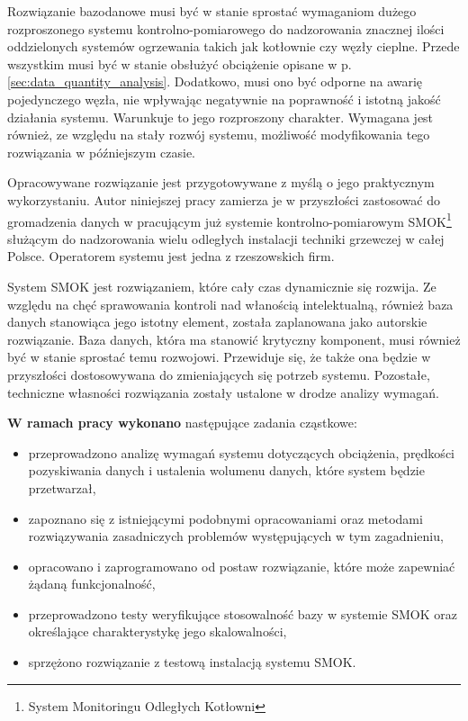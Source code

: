 \documentclass[a4paper,polish,12pt,twoside]{article}
\begin{document}
Rozwiązanie bazodanowe musi być w stanie sprostać wymaganiom dużego rozproszonego systemu kontrolno-pomiarowego do nadzorowania znacznej ilości oddzielonych systemów ogrzewania takich jak kotłownie czy węzły cieplne. Przede wszystkim musi  być w stanie obsłużyć obciążenie opisane w p. \ref{sec:data_quantity_analysis}. Dodatkowo, musi ono być odporne na awarię pojedynczego węzła, nie wpływając negatywnie na poprawność i istotną jakość działania systemu. Warunkuje to jego rozproszony charakter. Wymagana jest również, ze względu na stały rozwój systemu, możliwość modyfikowania tego rozwiązania w późniejszym czasie.

Opracowywane rozwiązanie jest przygotowywane z myślą o jego praktycznym wykorzystaniu. Autor niniejszej pracy zamierza je w przyszłości zastosować do gromadzenia danych w pracującym już systemie kontrolno-pomiarowym SMOK\footnote{System Monitoringu Odległych Kotłowni}\cite{smok} służącym do nadzorowania wielu odległych instalacji techniki grzewczej w całej Polsce. Operatorem systemu jest jedna z rzeszowskich firm.

System SMOK jest rozwiązaniem, które cały czas dynamicznie się rozwija. Ze względu na chęć sprawowania kontroli nad włanością intelektualną, również baza danych stanowiąca jego istotny element, została zaplanowana jako autorskie rozwiązanie. Baza danych, która ma stanowić krytyczny komponent, musi również być w stanie sprostać temu rozwojowi. Przewiduje się, że także ona będzie w przyszłości dostosowywana do zmieniających się potrzeb systemu. Pozostałe, techniczne własności rozwiązania zostały ustalone w drodze analizy wymagań.

\textbf{W ramach pracy wykonano }następujące zadania cząstkowe:
\begin{itemize}
	\item przeprowadzono analizę wymagań systemu dotyczących obciążenia, prędkości pozyskiwania danych i ustalenia wolumenu danych, które system będzie przetwarzał,
	\item zapoznano się z istniejącymi podobnymi opracowaniami oraz metodami rozwiązywania zasadniczych problemów występujących w tym zagadnieniu,
	\item opracowano i zaprogramowano od postaw rozwiązanie, które może zapewniać żądaną funkcjonalność,
	\item przeprowadzono testy weryfikujące stosowalność bazy w systemie SMOK oraz określające charakterystykę jego skalowalności,
	\item sprzężono rozwiązanie z testową instalacją systemu SMOK.
\end{itemize}
\end{document}
